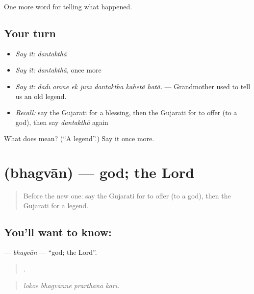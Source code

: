 \begin{grammarlens}[title={What you've built}]
One more word for telling what happened.
\end{grammarlens}

\subsection*{Your turn}
\begin{itemize}
\raggedright
  \item \emph{Say it:} \emph{dantakthā}
  \item \emph{Say it:} \emph{dantakthā}, once more
  \item \emph{Say it:} \emph{dādī amne ek jūnī dantakthā kahetā̃ hatā̃.} — Grandmother used to tell us an old legend.
  \item \emph{Recall:} say the Gujarati for a blessing, then the Gujarati for to offer (to a god), then say \emph{dantakthā} again
\end{itemize}

\begin{tcolorbox}[breakable,colback=teal!4,colframe=teal!35!black,title={Before you move on}]
What does  mean? (\textquotedblleft{}A legend\textquotedblright{}.) Say it once more.
\end{tcolorbox}
\section[\texorpdfstring{\gu{ભગવાન} (bhagvān)}{ભગવાન (bhagvān)}]{ (bhagvān) — god; the Lord}

\label{lesson:GU-C332-bhagvan}



\begin{quote}
Before the new one: say the Gujarati for to offer (to a god), then the Gujarati for a legend.
\end{quote}

\subsection*{You'll want to know: }
\textbf{} — \emph{bhagvān} — \textquotedblleft{}god; the Lord\textquotedblright{}.

\begin{quote}
   .
\end{quote}

\begin{quote}
\emph{lokoe bhagvānne prārthanā karī.}
\end{quote}

